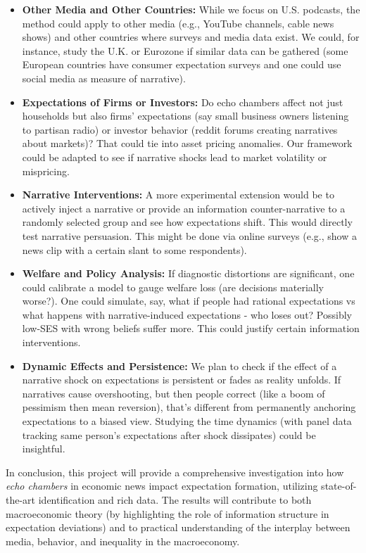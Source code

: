 \documentclass[12pt]{article}
\begin{document}
\begin{itemize}
    \item \textbf{Other Media and Other Countries:} While we focus on U.S. podcasts, the method could apply to other media (e.g., YouTube channels, cable news shows) and other countries where surveys and media data exist. We could, for instance, study the U.K. or Eurozone if similar data can be gathered (some European countries have consumer expectation surveys and one could use social media as measure of narrative).
    \item \textbf{Expectations of Firms or Investors:} Do echo chambers affect not just households but also firms' expectations (say small business owners listening to partisan radio) or investor behavior (reddit forums creating narratives about markets)? That could tie into asset pricing anomalies. Our framework could be adapted to see if narrative shocks lead to market volatility or mispricing.
    \item \textbf{Narrative Interventions:} A more experimental extension would be to actively inject a narrative or provide an information counter-narrative to a randomly selected group and see how expectations shift. This would directly test narrative persuasion. This might be done via online surveys (e.g., show a news clip with a certain slant to some respondents).
    \item \textbf{Welfare and Policy Analysis:} If diagnostic distortions are significant, one could calibrate a model to gauge welfare loss (are decisions materially worse?). One could simulate, say, what if people had rational expectations vs what happens with narrative-induced expectations - who loses out? Possibly low-SES with wrong beliefs suffer more. This could justify certain information interventions.
    \item \textbf{Dynamic Effects and Persistence:} We plan to check if the effect of a narrative shock on expectations is persistent or fades as reality unfolds. If narratives cause overshooting, but then people correct (like a boom of pessimism then mean reversion), that's different from permanently anchoring expectations to a biased view. Studying the time dynamics (with panel data tracking same person's expectations after shock dissipates) could be insightful.
\end{itemize}

In conclusion, this project will provide a comprehensive investigation into how \emph{echo chambers} in economic news impact expectation formation, utilizing state-of-the-art identification and rich data. The results will contribute to both macroeconomic theory (by highlighting the role of information structure in expectation deviations) and to practical understanding of the interplay between media, behavior, and inequality in the macroeconomy.
\end{document}
